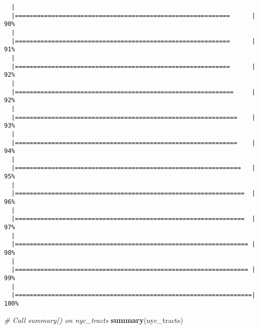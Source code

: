 \documentclass[]{article}
\newenvironment{Shaded}{\begin{snugshade}}{\end{snugshade}}
\newcommand{\CommentTok}[1]{\textcolor[rgb]{0.56,0.35,0.01}{\textit{#1}}}
\newcommand{\KeywordTok}[1]{\textcolor[rgb]{0.13,0.29,0.53}{\textbf{#1}}}
\newcommand{\NormalTok}[1]{#1}
\begin{document}
\begin{verbatim}
  |                                                                       
  |===========================================================      |  90%
  |                                                                       
  |===========================================================      |  91%
  |                                                                       
  |===========================================================      |  92%
  |                                                                       
  |============================================================     |  92%
  |                                                                       
  |=============================================================    |  93%
  |                                                                       
  |=============================================================    |  94%
  |                                                                       
  |==============================================================   |  95%
  |                                                                       
  |===============================================================  |  96%
  |                                                                       
  |===============================================================  |  97%
  |                                                                       
  |================================================================ |  98%
  |                                                                       
  |================================================================ |  99%
  |                                                                       
  |=================================================================| 100%
\end{verbatim}

\begin{Shaded}
\begin{Highlighting}[]
\CommentTok{# Call summary() on nyc_tracts}
\KeywordTok{summary}\NormalTok{(nyc_tracts)}
\end{Highlighting}
\end{Shaded}
\end{document}
